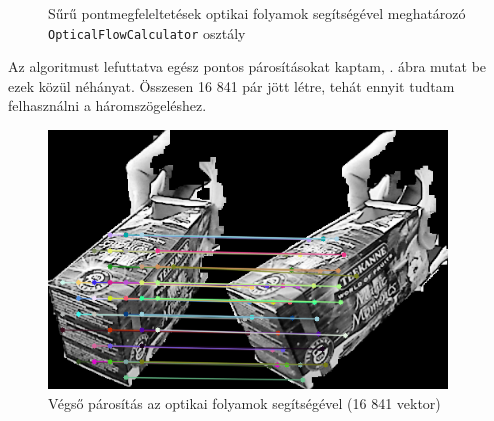 \begin{figure}[tbh]
\centering


\caption{Sűrű pontmegfeleltetések optikai folyamok segítségével meghatározó \texttt{OpticalFlowCalculator} osztály \label{fig:cd:ofcalc}}
\end{figure}

Az algoritmust lefuttatva egész pontos párosításokat kaptam, . ábra mutat be ezek közül néhányat. Összesen 16 841 pár jött létre, tehát ennyit tudtam felhasználni a háromszögeléshez. %

\begin{figure}[tbh]
\centering
\includegraphics[width=300pt]{figures/vis_full.png}
\caption{Végső párosítás az optikai folyamok segítségével (16 841 vektor) \label{fig:vis_full}}
\end{figure}

